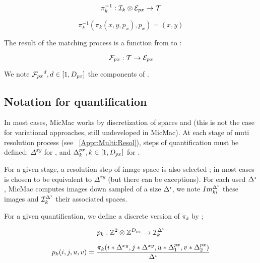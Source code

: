 \begin{equation}
   \pi_k^{-1} :   {\mathcal I}_k \otimes {\mathcal E}_{px} \rightarrow \mathcal T
\end{equation}

\begin{equation}
   \pi_k^{-1}(\pi_k(x,y,p_x),p_x) = (x,y)
\end{equation}


The result of the matching process is a function \FPx from
\ETer to \EPx:

\begin{equation}
   {\mathcal F}_{px} :   \mathcal T  \rightarrow  {\mathcal E}_{px}
\end{equation}

We note ${{\mathcal F}_{px}}^d,d\in [1,D_{px}]$ the components of \FPx.


\subsection{Notation for quantification}

\label{Disc:Quant}


In most cases, MicMac works by discretization of
spaces \ETer and \EPx (this is not the case for
variational approaches, still undeveloped in MicMac).
At each stage of muti resolution process (see ~\ref{Appr:Multi:Resol}),
steps of quantification must be defined: $\Delta^{xy}$ for \ETer ,
and $\Delta^{px}_k, k \in [1,D_{px}]$ for  \EPx.



For a given stage, a resolution  step \DeltaI of image space
is also selected ; in most cases  \DeltaI is chosen to be equivalent
to $\Delta^{xy}$ (but there can be exceptions).
For each used $\Delta^{\imath}$, MicMac computes images down sampled of a size $\Delta^{\imath}$, we note $Im_{ki}^{\Delta^{\imath}}$  these images
and ${\mathcal I}_k^{\Delta^{\imath}}$  their associated spaces.



For a given quantification, we define a discrete version
of $\pi_k$ by ;


\begin{equation}
   p_k : \mathbb{Z}^2 \otimes\mathbb{Z}^{D_{px}} \rightarrow {\mathcal I}_k^{\Delta^{\imath}}
\end{equation}

\begin{equation}
   p_k(i,j,u,v) = \frac{\pi_k(i*\Delta^{xy},j*\Delta^{xy},u*\Delta^{px}_1,v*\Delta^{px}_2)}{\Delta^{\imath}}
\label{EQ:Disc:Proj}
\end{equation}

